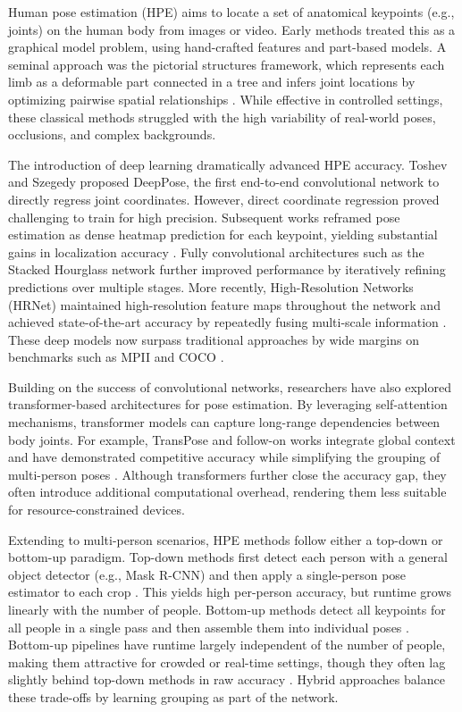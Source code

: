 Human pose estimation (HPE) aims to locate a set of anatomical keypoints (e.g., joints) on the human body from images or video. Early methods treated this as a graphical model problem, using hand-crafted features and part-based models. A seminal approach was the pictorial structures framework, which represents each limb as a deformable part connected in a tree and infers joint locations by optimizing pairwise spatial relationships \cite{Felzenszwalb2005}. While effective in controlled settings, these classical methods struggled with the high variability of real-world poses, occlusions, and complex backgrounds.

The introduction of deep learning dramatically advanced HPE accuracy. Toshev and Szegedy \cite{Toshev2014DeepPose} proposed DeepPose, the first end-to-end convolutional network to directly regress joint coordinates. However, direct coordinate regression proved challenging to train for high precision. Subsequent works reframed pose estimation as dense heatmap prediction for each keypoint, yielding substantial gains in localization accuracy \cite{Tompson2015}. Fully convolutional architectures such as the Stacked Hourglass network \cite{Newell2016} further improved performance by iteratively refining predictions over multiple stages. More recently, High-Resolution Networks (HRNet) maintained high-resolution feature maps throughout the network and achieved state-of-the-art accuracy by repeatedly fusing multi-scale information \cite{Sun_2019_CVPR}. These deep models now surpass traditional approaches by wide margins on benchmarks such as MPII and COCO \cite{Lan2023}.

Building on the success of convolutional networks, researchers have also explored transformer-based architectures for pose estimation. By leveraging self-attention mechanisms, transformer models can capture long-range dependencies between body joints. For example, TransPose and follow-on works integrate global context and have demonstrated competitive accuracy while simplifying the grouping of multi-person poses \cite{Stoffl2021}. Although transformers further close the accuracy gap, they often introduce additional computational overhead, rendering them less suitable for resource-constrained devices.

Extending to multi-person scenarios, HPE methods follow either a top-down or bottom-up paradigm. Top-down methods first detect each person with a general object detector (e.g., Mask R-CNN) and then apply a single-person pose estimator to each crop \cite{He2017}. This yields high per-person accuracy, but runtime grows linearly with the number of people. Bottom-up methods detect all keypoints for all people in a single pass and then assemble them into individual poses \cite{Cao_2017_CVPR}. Bottom-up pipelines have runtime largely independent of the number of people, making them attractive for crowded or real-time settings, though they often lag slightly behind top-down methods in raw accuracy \cite{Dubey2023PoseSurvey}. Hybrid approaches balance these trade-offs by learning grouping as part of the network.

